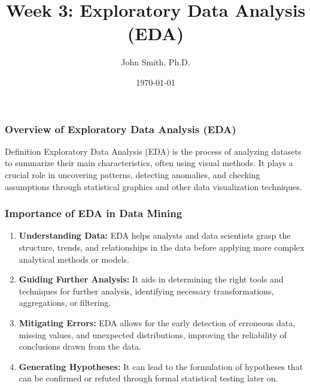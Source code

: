 \documentclass[aspectratio=169]{beamer}
\title[Academic Template]{Week 3: Exploratory Data Analysis (EDA)}
\author[J. Smith]{John Smith, Ph.D.}
\institute[University Name]{
  Department of Computer Science\\
  University Name\\
  \vspace{0.3cm}
  Email: email@university.edu\\
  Website: www.university.edu
}
\date{\today}
\begin{document}
\frame{\titlepage}

\begin{frame}[fragile]
    \titlepage
\end{frame}

\begin{frame}[fragile]
    \frametitle{Overview of Exploratory Data Analysis (EDA)}
    \begin{block}{Definition}
        Exploratory Data Analysis (EDA) is the process of analyzing datasets to summarize their main characteristics, often using visual methods. It plays a crucial role in uncovering patterns, detecting anomalies, and checking assumptions through statistical graphics and other data visualization techniques.
    \end{block}
\end{frame}

\begin{frame}[fragile]
    \frametitle{Importance of EDA in Data Mining}
    \begin{enumerate}
        \item \textbf{Understanding Data:} EDA helps analysts and data scientists grasp the structure, trends, and relationships in the data before applying more complex analytical methods or models.
        \item \textbf{Guiding Further Analysis:} It aids in determining the right tools and techniques for further analysis, identifying necessary transformations, aggregations, or filtering.
        \item \textbf{Mitigating Errors:} EDA allows for the early detection of erroneous data, missing values, and unexpected distributions, improving the reliability of conclusions drawn from the data.
        \item \textbf{Generating Hypotheses:} It can lead to the formulation of hypotheses that can be confirmed or refuted through formal statistical testing later on.
    \end{enumerate}
\end{frame}
\end{document}
